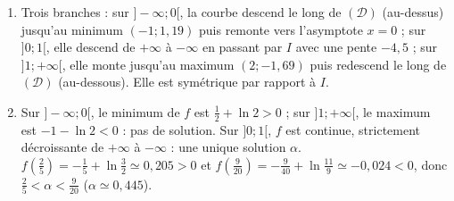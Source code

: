 \begin{corrige}
\begin{sol}
\begin{enumerate}
      tangente $y = -\frac{9}{2}\left(x - \frac{1}{2}\right) - \frac{1}{4}$, soit $\boxed{y = -\frac{9}{2}x + 2}$.
\item Trois branches : sur $]-\infty;0[$, la courbe descend le long de $(\mathcal{D})$ (au-dessus) jusqu'au minimum $(-1 ; 1{,}19)$ puis remonte vers
      l'asymptote $x = 0$ ; sur $]0;1[$, elle descend de $+\infty$ \`a $-\infty$ en passant par $I$ avec une pente $-4{,}5$ ; sur $]1;+\infty[$,
      elle monte jusqu'au maximum $(2 ; -1{,}69)$ puis redescend le long de $(\mathcal{D})$ (au-dessous). Elle est sym\'etrique par rapport \`a $I$.
\item Sur $]-\infty;0[$, le minimum de $f$ est $\frac{1}{2} + \ln 2 > 0$ ; sur $]1;+\infty[$, le maximum est $-1 - \ln 2 < 0$ : pas de solution.
      Sur $]0;1[$, $f$ est continue, strictement d\'ecroissante de $+\infty$ \`a $-\infty$ : une unique solution $\alpha$.
      $f\left(\frac{2}{5}\right) = -\frac{1}{5} + \ln\frac{3}{2} \simeq 0{,}205 > 0$ et $f\left(\frac{9}{20}\right) = -\frac{9}{40} + \ln\frac{11}{9} \simeq -0{,}024 < 0$,
      donc $\frac{2}{5} < \alpha < \frac{9}{20}$ ($\alpha \simeq 0{,}445$).
\end{enumerate}
\end{sol}


\end{corrige}
